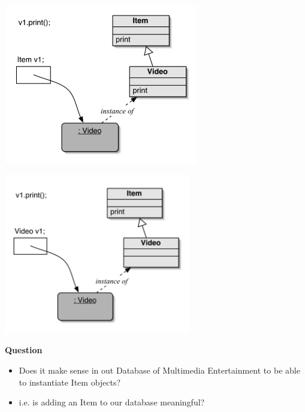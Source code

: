 \documentclass{beamer}
\begin{document}
\begin{frame}
\begin{center}
\includegraphics[height=7cm, keepaspectratio]{images/poly5}
\end{center}
\end{frame}

\begin{frame}
\begin{center}
\includegraphics[height=7cm, keepaspectratio]{images/poly6}
\end{center}
\end{frame}

\begin{frame}
\begin{center}
\textbf{Question}
\end{center} 
\begin{itemize}
\item Does it make sense in out Database of Multimedia Entertainment to be able to instantiate Item objects?
\item i.e. is adding an Item to our database meaningful?
\end{itemize}
\end{frame}
\end{document}
